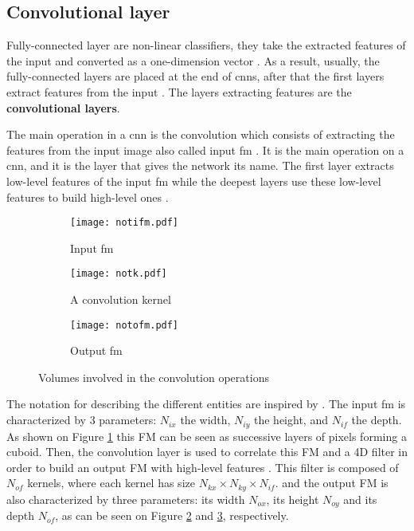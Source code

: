\subsection{Convolutional layer} \label{subs:2dconv}
%
Fully-connected layer are non-linear classifiers, they take the extracted features of the input and converted as a one-dimension vector \cite{khan_survey_2020}. As a result, usually, the fully-connected layers are placed at the end of \acrshort{cnn}s, after that the first layers extract features from the input \cite{liu_fpga-based_2019}. The layers extracting features are the \textbf{convolutional layers}.

The main operation in a \acrshort{cnn} is the convolution which consists of extracting the features from the input image also called input \acrfull{fm} \cite{liu_fpga-based_2019, zhao_towards_2018}. It is the main operation on a \acrshort{cnn}, and it is the layer that gives the network its name. The first layer extracts low-level features of the input \acrshort{fm} while the deepest layers use these low-level features to build high-level ones \cite{goodfellow_deep_2016}.

\begin{figure}
    \centering
    \begin{subfigure}{.32\textwidth}
    \centering
    \texttt{[image: notifm.pdf]}
    \caption{Input \acrshort{fm}}
    \label{fig:notation:ifm}
    \end{subfigure}
    \begin{subfigure}{.32\textwidth}
    \centering
    \texttt{[image: notk.pdf]}
    \caption{A convolution kernel}
    \label{fig:notation:k}
    \end{subfigure}
    \begin{subfigure}{.32\textwidth}
    \centering
    \texttt{[image: notofm.pdf]}
    \caption{Output \acrshort{fm}}
    \label{fig:notation:ofm}
    \end{subfigure}
    \caption{Volumes involved in the convolution operations}
    \label{fig:notconv}
\end{figure}
%
The notation for describing the different entities are inspired by \cite{ma_optimizing_2018}. The input \acrshort{fm} is characterized by 3 parameters: \textbf{$N_{ix}$} the width, \textbf{$N_{iy}$} the height, and \textbf{$N_{if}$} the depth. As shown on Figure \ref{fig:notation:ifm} this FM can be seen as successive layers of pixels forming a cuboid. Then, the convolution layer is used to correlate this FM and a 4D filter in order to build an output FM with high-level features \cite{zhao_towards_2018}.
This filter is composed of $N_{of}$ kernels, where each kernel has size $N_{kx} \times N_{ky} \times N_{if}$. and the output FM is also characterized by three parameters: its width $N_{ox}$, its height $N_{oy}$ and its depth $N_{of}$, as can be seen on Figure \ref{fig:notation:k} and \ref{fig:notation:ofm}, respectively.

